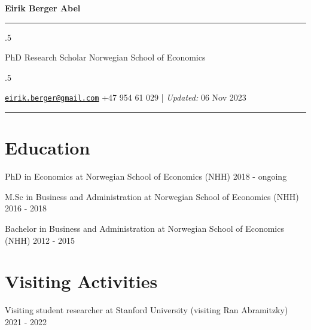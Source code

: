 \documentclass[11pt,]{article}
\begin{document}
\centerline{\huge \bf Eirik Berger Abel}

\vspace{2 mm}

\hrule

\vspace{2 mm}

\moveleft.5\hoffset\centerline{PhD Research Scholar \textbar{} Norwegian
School of Economics}

\moveleft.5\hoffset\centerline{ \faEnvelopeO \hspace{1 mm} \href{mailto:}{\tt \href{mailto:eirik.berger@gmail.com}{\nolinkurl{eirik.berger@gmail.com}}} \hspace{1 mm}  \faPhone \hspace{1 mm}  +47
954 61 029  \hspace{1 mm}         | \emph{Updated:} 06 Nov 2023}



\vspace{2 mm}

\hrule



\hypertarget{education}{%
\section{Education}\label{education}}

PhD in Economics at Norwegian School of Economics (NHH) \hfill 2018 -
ongoing\vspace{-0.2cm}

M.Sc in Business and Administration at Norwegian School of Economics
(NHH) \hfill 2016 - 2018\vspace{-0.2cm}

Bachelor in Business and Administration at Norwegian School of Economics
(NHH) \hfill 2012 - 2015\vspace{-0.2cm}

\vspace{0.5cm}

\hypertarget{visiting-activities}{%
\section{Visiting Activities}\label{visiting-activities}}

Visiting student researcher at Stanford University (visiting Ran
Abramitzky) \hfill 2021 - 2022\vspace{-0.2cm}

\vspace{0.5cm}
\end{document}
